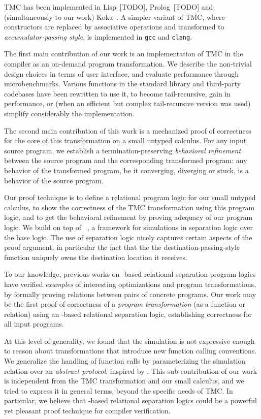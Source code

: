 TMC has been implemented in Lisp~[TODO], Prolog~[TODO] and (simultaneously to our work) Koka~\citep*{tmc-koka-2023}. A simpler variant of TMC, where constructors are replaced by associative operations and transformed to \emph{accumulator-passing style}, is implemented in \texttt{gcc} and \texttt{clang}.

The first main contribution of our work is an implementation of TMC in the \OCaml compiler as an on-demand program transformation.
%
We describe the non-trivial design choices in terms of user interface, and evaluate performance through microbenchmarks.
%
Various functions in the standard library and third-party codebases have been rewritten to use it, to become tail-recursive, gain in performance, or (when an efficient but complex tail-recursive version was used) simplify considerably the implementation.

The second main contribution of this work is a mechanized proof of correctness for the core of this transformation on a small untyped calculus.
%
For any input source program, we establish a termination-preserving \emph{behavioral refinement} between the source program and the corresponding transformed program: any behavior of the transformed program, be it converging, diverging or stuck, is a behavior of the source program.

Our proof technique is to define a relational program logic for our small untyped calculus, to show the correctness of the TMC transformation using this program logic, and to get the behavioral refinement by proving adequacy of our program logic. We build on top of \Simuliris~\citep*{simuliris-2022}, a framework for simulations in separation logic over the \Iris base logic. The use of separation logic nicely captures certain aspects of the proof argument, in particular the fact that the the destination-passing-style function uniquely owns the destination location it receives.

To our knowledge, previous works on \Iris-based relational separation program logics have verified \emph{examples} of interesting optimizations and program transformations, by formally proving relations between pairs of concrete programs. Our work may be the first proof of correctness of a \emph{program transformation} (as a function or relation) using an \Iris-based relational separation logic, establishing correctness for all input programs.

At this level of generality, we found that the \Simuliris simulation is not expressive enough to reason about transformations that introduce new function calling conventions.
%
We generalize the \Simuliris handling of function calls by parameterizing the simulation relation over an \emph{abstract protocol}, inspired by \citet*{protocols-2021}.
%
This sub-contribution of our work is independent from the TMC transformation and our small calculus,
and we tried to express it in general terms, beyond the specific needs of TMC.
%
In particular, we believe that \Iris-based relational separation logics could be a powerful yet pleasant proof technique for compiler verification.


